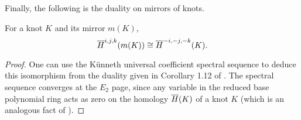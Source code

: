 Finally, the following is the duality on mirrors of knots.

\begin{proposition} \label{prop:duality}
    For a knot $K$ and its mirror $m(K)$,
    \[
        \overline{H}^{i, j, k}(m(K)) \cong \overline{H}^{-i, -j, -k}(K).
    \]
\end{proposition}

\begin{proof}
    One can use the K\"unneth universal coefficient spectral sequence to deduce this isomorphism from the duality given in Corollary 1.12 of \cite{EMAK}.
    The spectral sequence converges at the $E_2$ page, since any variable in the reduced base polynomial ring acts as zero on the homology $\overline{H}(K)$ of a knot $K$ (which is an analogous fact of \cite[Lemma 5.16]{Ras15}).
\end{proof}